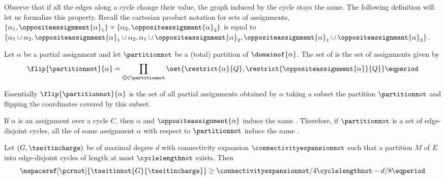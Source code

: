 Observe that if all the edges along a cycle change their value, the
graph induced by the cycle stays the same. The following definition
will let us formalize this property. Recall the cartesian product
notation for sets of assignments, \egComma
%
$\{\alpha_{1}, \oppositeassignment{\alpha}_{1}\}
\times
\{\alpha_{2}, \oppositeassignment{\alpha}_{2}\}$ is equal to
%
$\{\alpha_{1} \cup \alpha_{2}, \oppositeassignment{\alpha}_{1} \cup
\alpha_{2}, \alpha_{1} \cup \oppositeassignment{\alpha}_{2},
\oppositeassignment{\alpha}_{1} \cup \oppositeassignment{\alpha}_{2}
\}$.


\begin{definition}[\Flippedassignments]
  \label{def:flippedassignments}
  Let $\alpha$ be a partial assignment and let $\partitionnot$ be a (total) partition of $\domainof{\alpha}$. The set of  is the set of assignments given by
  \begin{equation*}
    \flip{\partitionnot}{\alpha}=\prod_{Q\in\partitionnot}\set{\restrict{\alpha}{Q},\restrict{\oppositeassignment{\alpha}}{Q}} \eqperiod
  \end{equation*}
\end{definition}

Essentially $\flip{\partitionnot}{\alpha}$ is the set of all partial
assignments obtained by $\alpha$ taking a subset the partition
$\partitionnot$ and flipping the coordinates covered by this subset.

\begin{observation}
  \label{obs:flipping-respects-induced}
  If $\alpha$ is an assignment over a cycle $C$, then $\alpha$ and $\oppositeassignment{\alpha}$ induce the same \chargedgraph. Therefore, if $\partitionnot$ is a set of edge-disjoint cycles, all the \flippedassignments of some assignment $\alpha$ with respect to $\partitionnot$ induce the same \chargedgraph.
\end{observation}

\begin{theorem}
  \label{th:tseitin-small-cycles-space-lower-bound-strengthened}
  Let $(G,\tseitincharge)$ be \Gnonsplitting \chargedgraph of maximal degree $d$ with connectivity expansion $\connectivityexpansionnot$ such that a partition $M$ of $E$ into edge-disjoint cycles of length at most $\cyclelengthnot$ exists. Then
  \begin{equation*}
    \mspaceref[\pcrnot]{\tseitinnot{G}{\tseitincharge}}\geq \connectivityexpansionnot/4\cyclelengthnot -d/8 \eqperiod
  \end{equation*}
\end{theorem}

